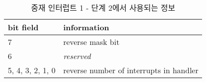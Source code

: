 %
%
\begin{table}[htbp]
\caption{중재 인터럽트 1 - 단계 2에서 사용되는 정보}\label{table:arb-int-p2}
   \begin{center}
   \begin{tabular}{|l|l|} \hline
	bit field & information \\
\hline \hline
	7 & reverse mask bit \\ \hline
	6 & {\it reserved} \\ \hline
	5, 4, 3, 2, 1, 0 & reverse number of interrupts in handler \\
\hline
   \end{tabular}
   \end{center}
\end{table}
%
%
